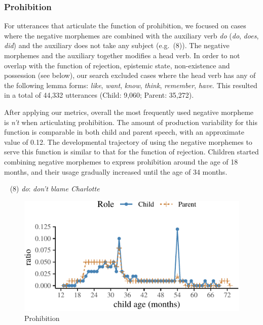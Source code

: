 \documentclass[10pt, letterpaper]{article}
\newenvironment{CodeChunk}{}{}
\begin{document}
\hypertarget{prohibition}{%
\subsubsection{Prohibition}\label{prohibition}}

For utterances that articulate the function of prohibition, we focused
on cases where the negative morphemes are combined with the auxiliary
verb \emph{do} (\emph{do}, \emph{does}, \emph{did}) and the auxiliary
does not take any subject (e.g.~(8)). The negative morphemes and the
auxiliary together modifies a head verb. In order to not overlap with
the function of rejection, epistemic state, non-existence and possession
(see below), our search excluded cases where the head verb has any of
the following lemma forms: \emph{like}, \emph{want}, \emph{know},
\emph{think}, \emph{remember}, \emph{have}. This resulted in a total of
44,332 utterances (Child: 9,060; Parent: 35,272).

After applying our metrics, overall the most frequently used negative
morpheme is \emph{n't} when articulating prohibition. The amount of
production variability for this function is comparable in both child and
parent speech, with an approximate value of 0.12. The developmental
trajectory of using the negative morphemes to serve this function is
similar to that for the function of rejection. Children started
combining negative morphemes to express prohibition around the age of 18
months, and their usage gradually increased until the age of 34 months.

~ (8) \emph{do}: \emph{don't blame Charlotte}

\begin{CodeChunk}
\begin{figure}[H]

{\centering \includegraphics{figs/prohibition-1} 

}

\caption[Prohibition]{Prohibition}\label{fig:prohibition}
\end{figure}
\end{CodeChunk}
\end{document}
